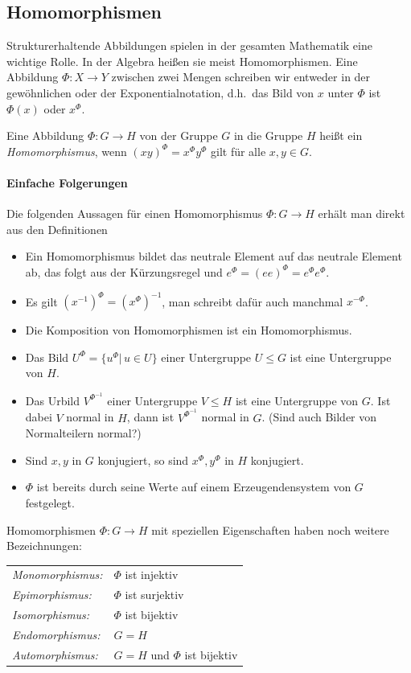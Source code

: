 \documentclass[12pt,a4paper,twoside]{article}
\newcommand{\ei}[1]{\emph{#1}\index{#1}}
\begin{document}
\subsection{Homomorphismen}
Strukturerhaltende Abbildungen spielen in der gesamten Mathematik eine
wichtige Rolle. In der Algebra hei\ss en sie meist Homomorphismen. Eine
Abbildung $\Phi:X\to Y$ zwischen zwei Mengen schreiben wir entweder in der
gew\"ohnlichen oder der Exponentialnotation, d.h.\ das Bild von $x$ unter
$\Phi$ ist $\Phi(x)$ oder $x^\Phi$.
\begin{Definition}
  Eine Abbildung $\Phi:G\to H$ von der Gruppe $G$ in die Gruppe $H$ hei\ss t
  ein \ei{Homomorphismus}, wenn $(xy)^\Phi=x^\Phi y^\Phi$ gilt f\"ur alle
  $x,y\in G$.
\end{Definition}
\paragraph{Einfache Folgerungen}
Die folgenden Aussagen f\"ur einen Homomorphismus $\Phi:G\to H$ erh\"alt man
direkt aus den Definitionen
\begin{itemize}
\item Ein Homomorphismus bildet das neutrale Element auf das neutrale Element
  ab, das folgt aus der K\"urzungsregel und $e^\Phi=(ee)^\Phi=e^\Phi e^\Phi$.
\item Es gilt $(x^{-1})^\Phi=(x^\Phi)^{-1}$, man schreibt daf\"ur auch
  manchmal $x^{-\Phi}$.
\item Die Komposition von Homomorphismen ist ein Homomorphismus.
\item Das Bild $U^\Phi=\{u^\Phi|\,u\in U\}$ einer Untergruppe $U\le G$ ist eine
  Untergruppe von $H$.
\item Das Urbild $V^{\Phi^{-1}}$ einer Untergruppe $V\le H$ ist eine
  Untergruppe von $G$. Ist dabei $V$ normal in $H$, dann ist $V^{\Phi^{-1}}$
  normal in $G$. (Sind auch Bilder von Normalteilern normal?)
\item Sind $x,y$ in $G$ konjugiert, so sind $x^\Phi,y^\Phi$ in $H$ konjugiert.
\item $\Phi$ ist bereits durch seine Werte auf einem Erzeugendensystem von $G$
  festgelegt.
\end{itemize}
Homomorphismen $\Phi:G\to H$ mit speziellen Eigenschaften haben noch weitere
Bezeichnungen:

  \begin{tabular}{ll}
\ei{Monomorphismus:} & $\Phi$ ist injektiv\\
\ei{Epimorphismus:} & $\Phi$ ist surjektiv\\
\ei{Isomorphismus:} & $\Phi$ ist bijektiv\\
\ei{Endomorphismus:} & $G=H$\\
\ei{Automorphismus:} & $G=H$ und $\Phi$ ist bijektiv
  \end{tabular}
\end{document}
